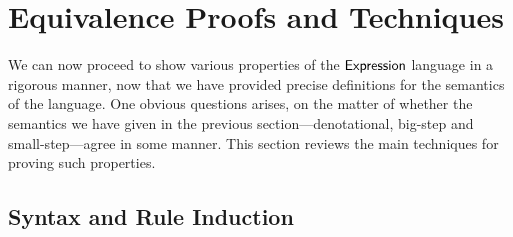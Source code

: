 

\section{Equivalence Proofs and Techniques}%

We can now proceed to show various properties of the $\textsf{Expression}$ language
in a rigorous manner, now that we have provided precise definitions for the
semantics of the language. One obvious questions arises, on the matter of
whether the semantics we have given in the previous section---denotational,
big-step and small-step---agree in some manner. This section reviews the
main techniques for proving such properties.

\subsection{Syntax and Rule Induction}%

